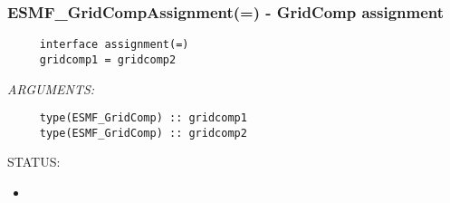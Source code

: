  
\setlength{\oldparskip}{\parskip}
\setlength{\parskip}{1.5ex}
\setlength{\oldparindent}{\parindent}
\setlength{\parindent}{0pt}
\setlength{\oldbaselineskip}{\baselineskip}
\setlength{\baselineskip}{11pt}
 
\def\bv{\begin{verbatim}}
\def\ev{\end{verbatim}}
\def\be{\begin{equation}}
\def\ee{\end{equation}}
\def\bea{\begin{eqnarray}}
\def\eea{\end{eqnarray}}
\def\bi{\begin{itemize}}
\def\ei{\end{itemize}}
\def\bn{\begin{enumerate}}
\def\en{\end{enumerate}}
\def\bd{\begin{description}}
\def\ed{\end{description}}
\def\({\left (}
\def\){\right )}
\def\[{\left [}
\def\]{\right ]}
\def\<{\left  \langle}
\def\>{\right \rangle}
\def\cI{{\cal I}}
\def\diag{\mathop{\rm diag}}
\def\tr{\mathop{\rm tr}}


 
\subsubsection [ESMF\_GridCompAssignment(=)] {ESMF\_GridCompAssignment(=) - GridComp assignment}


  
\begin{verbatim}     interface assignment(=)
     gridcomp1 = gridcomp2\end{verbatim}{\em ARGUMENTS:}
\begin{verbatim}     type(ESMF_GridComp) :: gridcomp1
     type(ESMF_GridComp) :: gridcomp2\end{verbatim}
{\sf STATUS:}
   \begin{itemize}
   \item{}
   \end{itemize}
  
